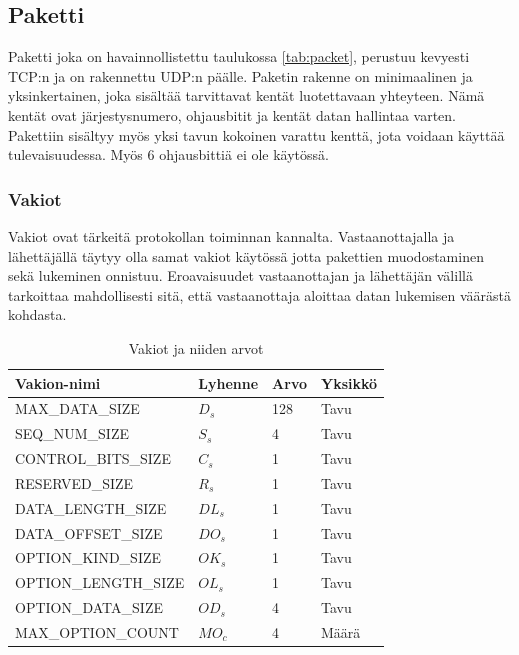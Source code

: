 \documentclass[a4paper,12pt]{article}
\begin{document}
    \subsection{Paketti}\label{sec:paketti}
    Paketti joka on havainnollistettu taulukossa \ref{tab:packet}, perustuu kevyesti TCP:n ja on rakennettu UDP:n päälle. Paketin rakenne on minimaalinen ja yksinkertainen, joka sisältää tarvittavat kentät luotettavaan yhteyteen. Nämä kentät ovat järjestysnumero, ohjausbitit ja kentät datan hallintaa varten. Pakettiin sisältyy myös yksi tavun kokoinen varattu kenttä, jota voidaan käyttää tulevaisuudessa. Myös 6 ohjausbittiä ei ole käytössä.

    \subsubsection{Vakiot}
    Vakiot ovat tärkeitä protokollan toiminnan kannalta. Vastaanottajalla ja lähettäjällä täytyy olla samat vakiot käytössä jotta pakettien muodostaminen sekä lukeminen onnistuu. Eroavaisuudet vastaanottajan ja lähettäjän välillä tarkoittaa mahdollisesti sitä, että vastaanottaja aloittaa datan lukemisen väärästä kohdasta.


    \begin{table}[h!]
        \centering
        \begin{tabular}{llll}
            Vakion-nimi          & Lyhenne & Arvo & Yksikkö \\
            \hline
            MAX\_DATA\_SIZE      & $D_s$   & 128  & Tavu    \\
            SEQ\_NUM\_SIZE       & $S_s$   & 4    & Tavu    \\
            CONTROL\_BITS\_SIZE  & $C_s$   & 1    & Tavu    \\
            RESERVED\_SIZE       & $R_s$   & 1    & Tavu    \\
            DATA\_LENGTH\_SIZE   & $DL_s$  & 1    & Tavu    \\
            DATA\_OFFSET\_SIZE   & $DO_s$  & 1    & Tavu    \\
            OPTION\_KIND\_SIZE   & $OK_s$  & 1    & Tavu    \\
            OPTION\_LENGTH\_SIZE & $OL_s$  & 1    & Tavu    \\
            OPTION\_DATA\_SIZE   & $OD_s$  & 4    & Tavu    \\
            MAX\_OPTION\_COUNT   & $MO_c$  & 4    & Määrä
        \end{tabular}
        \caption{Vakiot ja niiden arvot}
        \label{tab:vakiot}
    \end{table}
\end{document}
